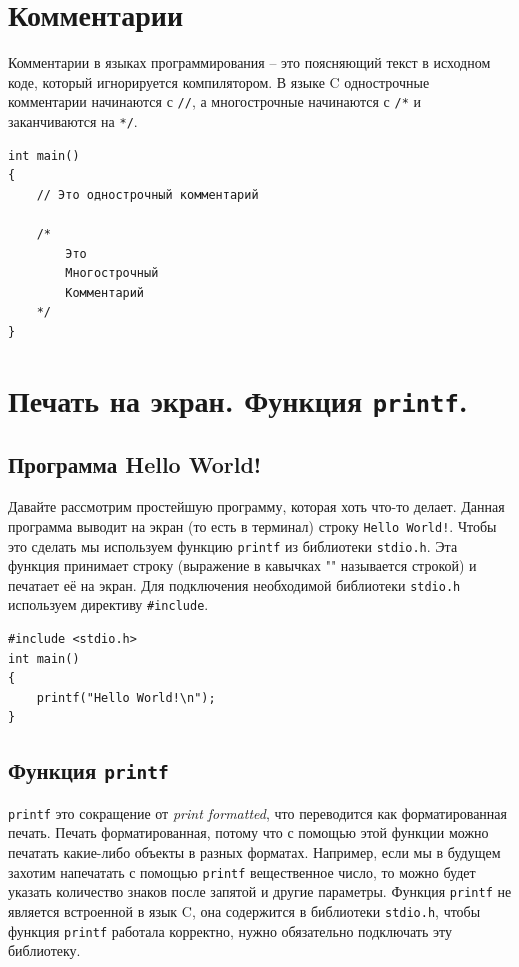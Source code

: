 \documentclass[10pt]{article}
\begin{document}
\section*{Комментарии}
Комментарии в языках программирования -- это поясняющий текст в исходном коде, который игнорируется компилятором. В языке C однострочные комментарии начинаются с \texttt{//}, а многострочные начинаются с \texttt{/*} и заканчиваются на \texttt{*/}.
\begin{lstlisting}
int main() 
{
    // Это однострочный комментарий
    
    /*
    	Это
    	Многострочный
    	Комментарий
    */
}
\end{lstlisting}




\section*{Печать на экран. Функция \texttt{printf}.}
\subsection*{Программа Hello World!}
Давайте рассмотрим простейшую программу, которая хоть что-то делает. Данная программа выводит на экран (то есть в терминал) строку \texttt{Hello World!}. Чтобы это сделать мы используем функцию \texttt{printf} из библиотеки \texttt{stdio.h}. Эта функция принимает строку (выражение в кавычках "{}"{} называется строкой) и печатает её на экран. Для подключения необходимой библиотеки \texttt{stdio.h} используем директиву \texttt{\#include}.
\begin{lstlisting}
#include <stdio.h>
int main() 
{
    printf("Hello World!\n");
}
\end{lstlisting}


\subsection*{Функция \texttt{printf}}
\texttt{printf} это сокращение от \textit{print formatted}, что переводится как форматированная печать.
Печать форматированная, потому что с помощью этой функции можно печатать какие-либо объекты в разных форматах.
Например, если мы в будущем захотим напечатать с помощью \texttt{printf} вещественное число, то можно будет
указать количество знаков после запятой и другие параметры. Функция \texttt{printf} не является встроенной в язык C, она содержится в библиотеки \texttt{stdio.h}, чтобы функция \texttt{printf} работала корректно, нужно обязательно подключать эту библиотеку.
\end{document}
